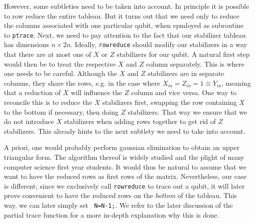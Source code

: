 However,
some subtleties need to be taken into account. In principle it is possible to
row reduce the entire tableau. But it turns out that we need only to reduce the
columns associated with one particular qubit, when epmloyed as subroutine to
\verb|ptrace|. Next, we need to pay attention to the fact that our stabilizer
tableau has dimensions $n\times 2n$. Ideally, \verb|rowreduce| should modify
our stabilizers in a way that there are at most one of $X$ or $Z$ stabilizers
for our qubit. A natural first step would then be to treat the respective $X$
and $Z$ column separately. This is where one needs to be careful. Although the $X$
and $Z$ stabilizers are in separate columns, they share the rows, e.g. in the
case where $X_{ia}=Z_{ia}=1\equiv Y_{ia}$, meaning that
a reduction of $X$ will influence the $Z$ column and vice versa. One way to
reconcile this is to reduce the $X$ stabilizers first, swapping the row
containing $X$ to the bottom if necessary, then doing $Z$ stabilizers. That way
we ensure that we do not introduce $X$ stabilizers when adding rows together
to get rid of $Z$ stabilizers. This already hints to the next subtlety we need
to take into account.

A priori, one would probably perform gaussian
elimination to obtain an upper triangular form. The algorithm thereof is widely
studied and the plight of many computer science first year students. It would
thus be natural to assume that we want to have the reduced rows as first rows
of the matrix. Nevertheless, our case is different; since we exclusively call
\verb|rowreduce| to trace out a qubit, it will later prove convenient to have
the reduced rows on the \emph{bottom} of the tableau. This way, we can later
simply set \verb| N=N-1;|. We refer to the later discussion of the partial
trace function for a more in-depth explanation why this is done.

